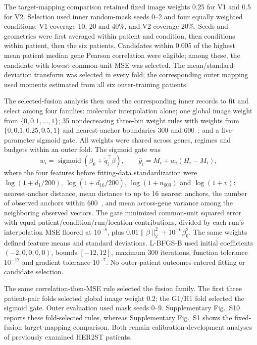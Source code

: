 The target-mapping comparison retained fixed image weights 0.25 for V1 and 0.5 for V2. Selection used inner random-mask seeds 0--2 and four equally weighted conditions: V1 coverage 10, 20 and 40\%, and V2 coverage 20\%. Seeds and geometries were first averaged within patient and condition, then conditions within patient, then the six patients. Candidates within 0.005 of the highest mean patient median gene Pearson correlation were eligible; among these, the candidate with lowest common-unit MSE was selected. The mean/standard-deviation transform was selected in every fold; the corresponding outer mapping used moments estimated from all six outer-training patients.

The selected-fusion analysis then used the corresponding inner records to fit and select among four families: molecular interpolation alone; one global image weight from $\{0,0.1,\ldots,1\}$; 35 nondecreasing three-bin weight rules with weights from $\{0,0.1,0.25,0.5,1\}$ and nearest-anchor boundaries 300 and 600~\um{}; and a five-parameter sigmoid gate. All weights were shared across genes, regimes and budgets within an outer fold. The sigmoid gate was
\[
 w_i=\operatorname{sigmoid}(\beta_0+\widetilde q_i^\top\beta),\qquad
 \widehat y_i=M_i+w_i(H_i-M_i),
\]
where the four features before fitting-data standardization were $\log(1+d_1/200)$, $\log(1+\overline d_{16}/200)$, $\log(1+n_{600})$ and $\log(1+v)$: nearest-anchor distance, mean distance to up to 16 nearest anchors, the number of observed anchors within 600~\um{}, and mean across-gene variance among the neighboring observed vectors. The gate minimized common-unit squared error with equal patient/condition/run/location contributions, divided by each run's interpolation MSE floored at $10^{-8}$, plus $0.01\|\beta\|_2^2+10^{-6}\beta_0^2$. The same weights defined feature means and standard deviations. L-BFGS-B used initial coefficients $(-2,0,0,0,0)$, bounds $[-12,12]$, maximum 300 iterations, function tolerance $10^{-12}$ and gradient tolerance $10^{-7}$. No outer-patient outcomes entered fitting or candidate selection.

The same correlation-then-MSE rule selected the fusion family. The first three patient-pair folds selected global image weight 0.2; the G1/H1 fold selected the sigmoid gate. Outer evaluation used mask seeds 0--9. Supplementary Fig.~S10 reports these fold-selected rules, whereas Supplementary Fig.~S1 shows the fixed-fusion target-mapping comparison. Both remain calibration-development analyses of previously examined HER2ST patients.


